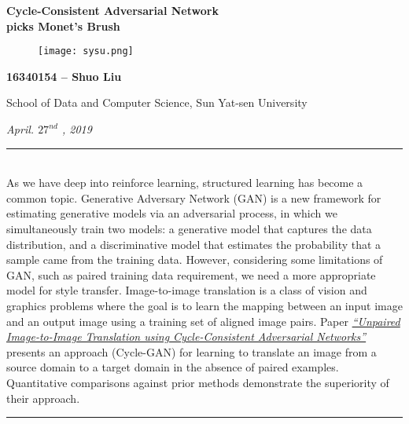 \documentclass[a4paper]{article}
\newcommand{\HRule}{\rule{\linewidth}{0.5mm}}
\begin{document}
\vspace{6mm}
\begin{center}
\huge\textbf{Cycle-Consistent Adversarial Network \\}
\vspace{3mm}
\huge\textbf{picks Monet's Brush}
\end{center}
\vspace{3mm}

\begin{figure}[H]
\centering
\texttt{[image: sysu.png]}
\end{figure}

\vspace{2mm}
\begin{center}
\large\textbf{16340154 -- Shuo Liu }\\
\end{center}

\begin{center}
\normalsize{School of Data and Computer Science, Sun Yat-sen University}
\end{center}

\begin{center}
\textit{April. $27^{nd}$ \textit, 2019\\}
\end{center}
\vspace{5mm}

\noindent \HRule
\vspace{2.5mm} \\
\large{As we have deep into reinforce learning, structured learning has become a common topic. Generative Adversary Network (\textsf{GAN}) is a new framework for estimating generative models via an adversarial process, in which we simultaneously train two models: a generative model that captures the data distribution, and a discriminative model that estimates the probability that a sample came from the training data. However, considering some limitations of \textsf{GAN}, such as paired training data requirement, we need a more appropriate model for style transfer. Image-to-image translation is a class of vision and graphics problems where the goal is to learn the mapping between an input image and an output image using a training set of aligned image pairs. Paper \href{https://arxiv.org/pdf/1703.10593.pdf}{\emph{``Unpaired Image-to-Image Translation using Cycle-Consistent Adversarial Networks''}} presents an approach (\textsf{Cycle-GAN}) for learning to translate an image from a source domain to a target domain in the absence of paired examples. Quantitative comparisons against prior methods demonstrate the superiority of their approach.}
\vspace{2mm} \\
\HRule
\end{document}
